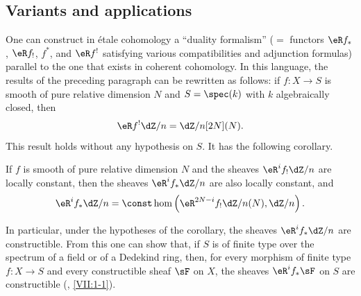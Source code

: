 \subsection{Variants and applications}\label{I:6-4}

One can construct in étale cohomology a “duality formalism”
($=$ functors $\eR f_*$, $\eR f_!$, $f^*$, and $\eR f^!$ satisfying various
compatibilities and adjunction formulas) parallel to the one that exists
in coherent cohomology. In this language, the results of the preceding
paragraph can be rewritten as follows: if $f:X\to S$ is smooth of pure
relative dimension $N$ and $S=\spec(k)$ with $k$ algebraically closed,
then
\[
  \eR f^! \dZ/n = \dZ/n [2N](N) \text{.}
\]
This result holds without any hypothesis on $S$. It has the following
corollary.

\begin{corollary}\label{I:6-4-1}
If $f$ is smooth of pure relative dimension $N$ and the sheaves
$\eR^if_!\dZ/n$ are locally constant, then the sheaves
$\eR^if_*\dZ/n$ are also locally constant, and
\[
  \eR^i f_* \dZ/n = \const\hom\left(\eR^{2 N-i} f_! \dZ/n(N),\dZ/n\right)\text{.}
\]
\end{corollary}

In particular, under the hypotheses of the corollary, the sheaves
$\eR^if_*\dZ/n$ are constructible. From this one can show that, if $S$
is of finite type over the spectrum of a field or of a Dedekind ring,
then, for every morphism of finite type $f:X\to S$ and every constructible
sheaf $\sF$ on $X$, the sheaves $\eR^if_*\sF$ on $S$ are constructible
(, \ref{VII:1-1}).


